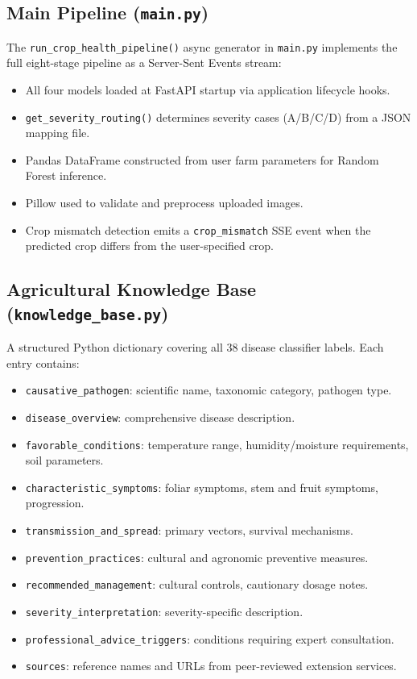 \subsection{Main Pipeline (\texttt{main.py})}

The \texttt{run\_crop\_health\_pipeline()} async generator in \texttt{main.py} implements the full eight-stage pipeline as a Server-Sent Events stream:
\begin{itemize}
    \item All four models loaded at FastAPI startup via application lifecycle hooks.
    \item \texttt{get\_severity\_routing()} determines severity cases (A/B/C/D) from a JSON mapping file.
    \item Pandas DataFrame constructed from user farm parameters for Random Forest inference.
    \item Pillow used to validate and preprocess uploaded images.
    \item Crop mismatch detection emits a \texttt{crop\_mismatch} SSE event when the predicted crop differs from the user-specified crop.
\end{itemize}

\subsection{Agricultural Knowledge Base (\texttt{knowledge\_base.py})}

A structured Python dictionary covering all 38 disease classifier labels. Each entry contains:
\begin{itemize}
    \item \texttt{causative\_pathogen}: scientific name, taxonomic category, pathogen type.
    \item \texttt{disease\_overview}: comprehensive disease description.
    \item \texttt{favorable\_conditions}: temperature range, humidity/moisture requirements, soil parameters.
    \item \texttt{characteristic\_symptoms}: foliar symptoms, stem and fruit symptoms, progression.
    \item \texttt{transmission\_and\_spread}: primary vectors, survival mechanisms.
    \item \texttt{prevention\_practices}: cultural and agronomic preventive measures.
    \item \texttt{recommended\_management}: cultural controls, cautionary dosage notes.
    \item \texttt{severity\_interpretation}: severity-specific description.
    \item \texttt{professional\_advice\_triggers}: conditions requiring expert consultation.
    \item \texttt{sources}: reference names and URLs from peer-reviewed extension services.
\end{itemize}

